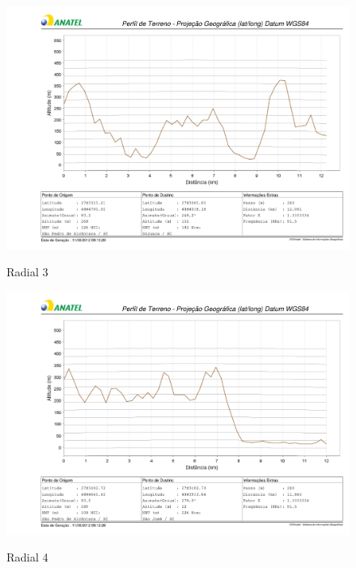 \begin{figure}[ht] %
\begin{center}
\includegraphics[scale=.5]{./figuras/nmt3_v2.pdf} %

Radial 3
\end{center}
\label{nmt3}
\end{figure}

\begin{figure}[ht] %
\begin{center}
\includegraphics[scale=.5]{./figuras/nmt4_v2.pdf} %

Radial 4
\end{center}
\label{nmt4}
\end{figure}

